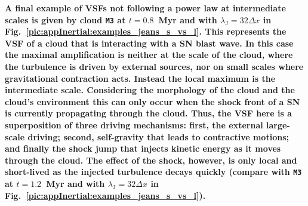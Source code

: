 \textbf{A final example of VSFs not following a power law at intermediate scales is given
    by cloud \texttt{M3} at $t=0.8$~Myr and with
    $\lambda_\mathrm{J} = 32\Delta x$ in
    Fig.~\ref{pic:appInertial:examples_jeans_s_vs_l}.  This represents the VSF of a cloud that is interacting with a SN blast wave.
    In this case the maximal amplification is neither 
    at the scale 
of the cloud, where the turbulence is driven by external sources, nor on small scales where gravitational contraction acts.
    Instead the local maximum is the intermediate scale. 
    Considering the morphology of the cloud and the cloud's environment this can only occur when the shock front of a SN is currently propagating through the cloud. 
    Thus, the VSF here is a superposition of three driving mechanisms:
    first, the external large-scale driving; second, self-gravity that
    leads to contractive motions; and finally the shock jump that injects kinetic energy as it moves through the cloud. 
    The effect of the shock, however, is only local and short-lived as
    the injected turbulence decays quickly (compare with \texttt{M3}
    at $t=1.2$~Myr and with $\lambda_\mathrm{J} = 32\Delta x$ in Fig.~\ref{pic:appInertial:examples_jeans_s_vs_l}).
}












